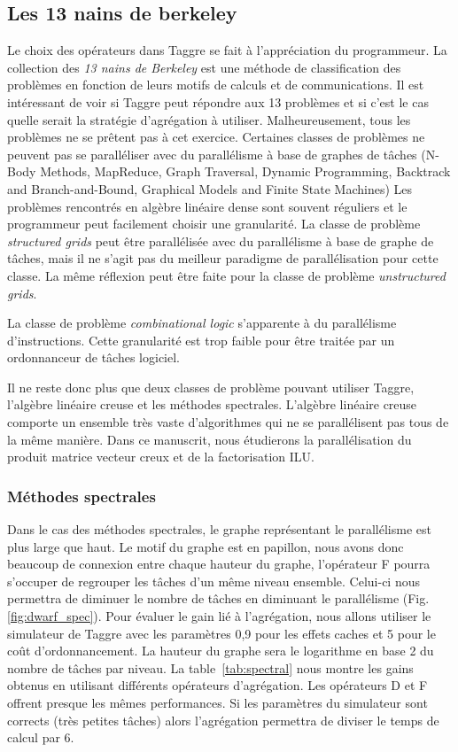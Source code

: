 \subsection{Les 13 nains de berkeley}
Le choix des opérateurs dans Taggre se fait à l'appréciation du programmeur.
%
La collection des {\em 13 nains de Berkeley}\cite{dwarfs} est une méthode de classification des problèmes en fonction de leurs motifs de calculs et de communications.
%
Il est intéressant de voir si Taggre peut répondre aux 13 problèmes et si c'est le cas quelle serait la stratégie d'agrégation à utiliser.
%
Malheureusement, tous les problèmes ne se prêtent pas à cet exercice.
%
Certaines classes de problèmes ne peuvent pas se paralléliser avec du parallélisme à base de graphes de tâches
(N-Body Methods, MapReduce, Graph Traversal, Dynamic Programming, Backtrack and Branch-and-Bound, Graphical Models and Finite State Machines)
%
Les problèmes rencontrés en algèbre linéaire dense sont souvent réguliers et le programmeur peut facilement choisir une granularité.
%
La classe de problème {\em structured grids} peut être parallélisée avec du parallélisme à base de graphe de tâches, mais il ne s'agit pas du meilleur paradigme de parallélisation pour cette classe.
%
La même réflexion peut être faite pour la classe de problème {\em unstructured grids}.


La classe de problème {\em combinational logic} s'apparente à du parallélisme d'instructions.
%
Cette granularité est trop faible pour être traitée par un ordonnanceur de tâches logiciel.

Il ne reste donc plus que deux classes de problème pouvant utiliser Taggre, l'algèbre linéaire creuse et les méthodes spectrales.
%
L'algèbre linéaire creuse comporte un ensemble très vaste d'algorithmes qui ne se parallélisent pas tous de la même manière.
%
Dans ce manuscrit, nous étudierons la parallélisation du produit matrice vecteur creux et de la factorisation ILU.



\subsubsection{Méthodes spectrales}
Dans le cas des méthodes spectrales, le graphe représentant le parallélisme est plus large que haut.
%
Le motif du graphe est en papillon, nous avons donc beaucoup de connexion entre chaque hauteur du graphe, l'opérateur F pourra s'occuper de regrouper les tâches d'un même niveau ensemble.
%
Celui-ci nous permettra de diminuer le nombre de tâches en diminuant le parallélisme (Fig.\ref{fig:dwarf_spec}).
%
Pour évaluer le gain lié à l'agrégation, nous allons utiliser le simulateur de Taggre avec les paramètres 0,9 pour les effets caches et 5 pour le coût d'ordonnancement.
%
La hauteur du graphe sera le logarithme en base 2 du nombre de tâches par niveau.
%
La table~\ref{tab:spectral} nous montre les gains obtenus en utilisant différents opérateurs d'agrégation.
%
Les opérateurs D et F offrent presque les mêmes performances.
%
Si les paramètres du simulateur sont corrects (très petites tâches) alors l'agrégation permettra de diviser le temps de calcul par 6.


